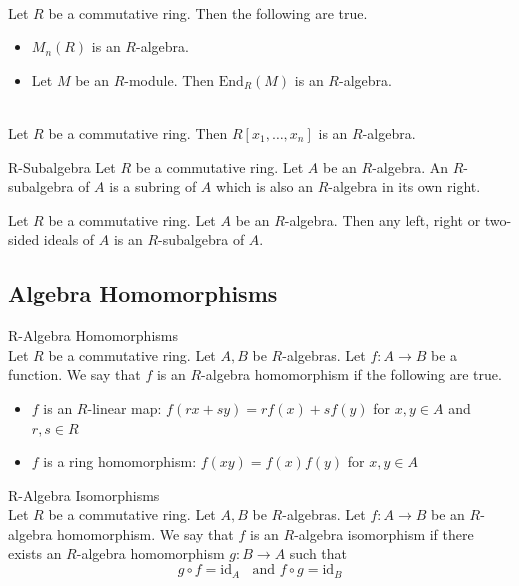 \documentclass[a4paper]{article}
\begin{document}
\begin{eg}{}{}\\
Let $R$ be a commutative ring. Then the following are true. 
\begin{itemize}
\item $M_n(R)$ is an $R$-algebra. 
\item Let $M$ be an $R$-module. Then $\text{End}_R(M)$ is an $R$-algebra. 
\end{itemize}
\end{eg}

\begin{eg}{}{}\\
Let $R$ be a commutative ring. Then $R[x_1,\dots,x_n]$ is an $R$-algebra. 
\end{eg}

\begin{defn}{R-Subalgebra}{} Let $R$ be a commutative ring. Let $A$ be an $R$-algebra. An $R$-subalgebra of $A$ is a subring of $A$ which is also an $R$-algebra in its own right. 
\end{defn}

\begin{prp}{}{} Let $R$ be a commutative ring. Let $A$ be an $R$-algebra. Then any left, right or two-sided ideals of $A$ is an $R$-subalgebra of $A$. 
\end{prp}

\subsection{Algebra Homomorphisms}
\begin{defn}{R-Algebra Homomorphisms}{}\\
Let $R$ be a commutative ring. Let $A,B$ be $R$-algebras. Let $f:A\to B$ be a function. We say that $f$ is an $R$-algebra homomorphism if the following are true. 
\begin{itemize}
\item $f$ is an $R$-linear map: $f(rx+sy)=rf(x)+sf(y)$ for $x,y\in A$ and $r,s\in R$
\item $f$ is a ring homomorphism: $f(xy)=f(x)f(y)$ for $x,y\in A$
\end{itemize}
\end{defn}

\begin{defn}{R-Algebra Isomorphisms}{}\\
Let $R$ be a commutative ring. Let $A,B$ be $R$-algebras. Let $f:A\to B$ be an $R$-algebra homomorphism. We say that $f$ is an $R$-algebra isomorphism if there exists an $R$-algebra homomorphism $g:B\to A$ such that $$g\circ f=\text{id}_A\;\;\text{ and }f\circ g=\text{id}_B$$
\end{defn}
\end{document}
